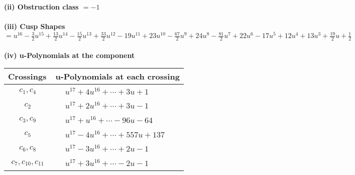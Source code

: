 \documentclass[1p]{elsarticle_modified}
\theoremstyle{definition}
\begin{document}
\flushleft \textbf{(ii) Obstruction class $= -1$}\\~\\
\flushleft \textbf{(iii) Cusp Shapes $= u^{16}-\frac{3}{2} u^{15}+\frac{13}{2} u^{14}-\frac{15}{2} u^{13}+\frac{33}{2} u^{12}-19 u^{11}+23 u^{10}-\frac{67}{2} u^9+24 u^8-\frac{81}{2} u^7+22 u^6-17 u^5+12 u^4+13 u^3+\frac{19}{2} u+\frac{1}{2}$}\\~\\
\newpage\renewcommand{\arraystretch}{1}
\flushleft \textbf{(iv) u-Polynomials at the component}\newline \\
\begin{tabular}{m{50pt}|m{274pt}}
Crossings & \hspace{64pt}u-Polynomials at each crossing \\
\hline $$\begin{aligned}c_{1},c_{4}\end{aligned}$$&$\begin{aligned}
&u^{17}+4 u^{16}+\cdots+3 u+1
\end{aligned}$\\
\hline $$\begin{aligned}c_{2}\end{aligned}$$&$\begin{aligned}
&u^{17}+2 u^{16}+\cdots+3 u-1
\end{aligned}$\\
\hline $$\begin{aligned}c_{3},c_{9}\end{aligned}$$&$\begin{aligned}
&u^{17}+u^{16}+\cdots-96 u-64
\end{aligned}$\\
\hline $$\begin{aligned}c_{5}\end{aligned}$$&$\begin{aligned}
&u^{17}-4 u^{16}+\cdots+557 u+137
\end{aligned}$\\
\hline $$\begin{aligned}c_{6},c_{8}\end{aligned}$$&$\begin{aligned}
&u^{17}-3 u^{16}+\cdots+2 u-1
\end{aligned}$\\
\hline $$\begin{aligned}c_{7},c_{10},c_{11}\end{aligned}$$&$\begin{aligned}
&u^{17}+3 u^{16}+\cdots-2 u-1
\end{aligned}$\\
\hline
\end{tabular}\\~\\
\end{document}
